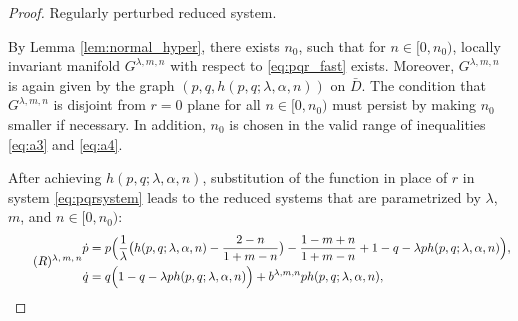 \documentclass[a4paper,11pt]{article}
\begin{document}
\smallskip
\noindent
\begin{proof}
\medskip {}
 Regularly perturbed reduced system.
\medskip

By Lemma \ref{lem:normal_hyper}, there exists $n_0$, such that for $n \in [0, n_0)$, locally invariant manifold $G^{\lambda,m,n}$ with respect to \eqref{eq:pqr_fast} exists. Moreover,   $G^{\lambda,m,n}$ is again given by the graph $(p,q,h(p,q;\lambda,\alpha,n))$ on $\bar{D}$. The condition that $G^{\lambda,m,n}$ is disjoint from $r=0$ plane for all $n \in [0, n_0)$ must persist by making $n_0$ smaller if necessary. In addition, $n_0$ is chosen in the valid range of inequalities \eqref{eq:a3} and \eqref{eq:a4}.%

After achieving $h(p,q;\lambda,\alpha,n)$, substitution of the function in place of $r$ in system \eqref{eq:pqrsystem} leads to  the reduced systems that are parametrized by $\lambda$, $m$, and $n\in[0,n_0)$:
{\small
\begin{equation} \tag*{(${R}$)\textsuperscript{$\lambda,m,n$}} \label{eq:reduced}
\begin{split}
 \dot{p} &=p\Big(\frac{1}{ \lambda }\big(h(p,q;\lambda,\alpha,n) - \frac{2-n}{1+m-n}\big) - \frac{1-m+n}{1+m-n} + 1-q- \lambda p h(p,q;\lambda,\alpha,n)\Big),\\
 \dot{q} &=q\Big(                                                                          1-q- \lambda p h(p,q;\lambda,\alpha,n)\Big) + b^{\lambda,m,n}ph(p,q;\lambda,\alpha,n),
\end{split}
\end{equation}
}


\end{proof}
\end{document}
